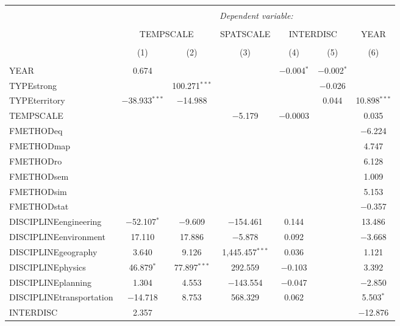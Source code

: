 
\begin{table}[!htbp] \centering 
  \caption{} 
  \label{} 
\begin{tabular}{@{\extracolsep{5pt}}lcccccc} 
\\[-1.8ex]\hline 
\hline \\[-1.8ex] 
 & \multicolumn{6}{c}{\textit{Dependent variable:}} \\ 
\cline{2-7} 
\\[-1.8ex] & \multicolumn{2}{c}{TEMPSCALE} & SPATSCALE & \multicolumn{2}{c}{INTERDISC} & YEAR \\ 
\\[-1.8ex] & (1) & (2) & (3) & (4) & (5) & (6)\\ 
\hline \\[-1.8ex] 
 YEAR & 0.674 &  &  & $-$0.004$^{*}$ & $-$0.002$^{*}$ &  \\ 
  TYPEstrong &  & 100.271$^{***}$ &  &  & $-$0.026 &  \\ 
  TYPEterritory & $-$38.933$^{***}$ & $-$14.988 &  &  & 0.044 & 10.898$^{***}$ \\ 
  TEMPSCALE &  &  & $-$5.179 & $-$0.0003 &  & 0.035 \\ 
  FMETHODeq &  &  &  &  &  & $-$6.224 \\ 
  FMETHODmap &  &  &  &  &  & 4.747 \\ 
  FMETHODro &  &  &  &  &  & 6.128 \\ 
  FMETHODsem &  &  &  &  &  & 1.009 \\ 
  FMETHODsim &  &  &  &  &  & 5.153 \\ 
  FMETHODstat &  &  &  &  &  & $-$0.357 \\ 
  DISCIPLINEengineering & $-$52.107$^{*}$ & $-$9.609 & $-$154.461 & 0.144 &  & 13.486 \\ 
  DISCIPLINEenvironment & 17.110 & 17.886 & $-$5.878 & 0.092 &  & $-$3.668 \\ 
  DISCIPLINEgeography & 3.640 & 9.126 & 1,445.457$^{***}$ & 0.036 &  & 1.121 \\ 
  DISCIPLINEphysics & 46.879$^{*}$ & 77.897$^{***}$ & 292.559 & $-$0.103 &  & 3.392 \\ 
  DISCIPLINEplanning & 1.304 & 4.553 & $-$143.554 & $-$0.047 &  & $-$2.850 \\ 
  DISCIPLINEtransportation & $-$14.718 & 8.753 & 568.329 & 0.062 &  & 5.503$^{*}$ \\ 
  INTERDISC & 2.357 &  &  &  &  & $-$12.876 \\ 

\end{tabular}
\end{table}
